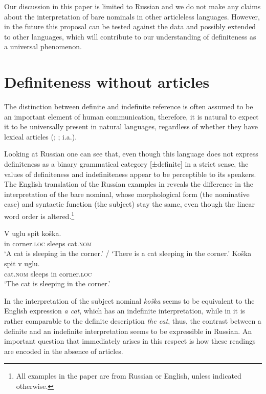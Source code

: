 \documentclass[output=paper,
colorlinks,
citecolor=brown,
newtxmath
]{langscibook}
\begin{document}
Our discussion in this paper is limited to Russian and we do not make any claims
about the interpretation of bare nominals in other articleless languages. However, in the future this proposal can be tested against the data and possibly extended to other languages, which will contribute to our understanding of definiteness as a universal phenomenon.

\section{Definiteness without articles}
\label{sec:definiteness-without-articles}
The distinction between definite and indefinite reference is often assumed to be an important element of human communication, therefore, it is natural to expect it to be universally present in natural languages, regardless of whether they have lexical articles (\citealt{Brun2001}; %
\citealt{Zlatic2014}; i.a.).

Looking at Russian one can see that, even though this language does not express definiteness as a binary %
grammatical category [±definite] in a strict sense, the values of definiteness and indefiniteness %
appear to be perceptible to its speakers. The English translation of the Russian examples in  reveals the difference in the interpretation of the bare nominal, whose morphological form (the nominative case) and syntactic function (the subject) stay the same, even though the linear word order is altered.\footnote{All examples in the paper are from Russian or English, unless indicated otherwise.}

\ea \label{koshka}
\ea \label{ex:1a} \gll V uglu spit koška.\\
         in corner.\textsc{loc} sleeps cat.\textsc{nom}\\
\glt    `A cat is sleeping in the corner.' / `There is a cat sleeping in the corner.'
\ex \label{ex:1b}
 \gll Koška	spit v uglu. \\
    cat.\textsc{nom} 	sleeps 	in 	corner.\textsc{loc} \\
 \glt   `The cat is sleeping in the corner.'
\z\z

\noindent In  the interpretation of the subject nominal \textit{koška} seems to be equivalent to the English expression \textit{a cat}, which has an indefinite interpretation, while in  it is rather comparable to the definite description \textit{the cat}, thus, the contrast between a definite and an indefinite interpretation seems to be
expressible in Russian. An important question that immediately arises in this respect is how these readings are encoded in the absence of articles.
\end{document}
